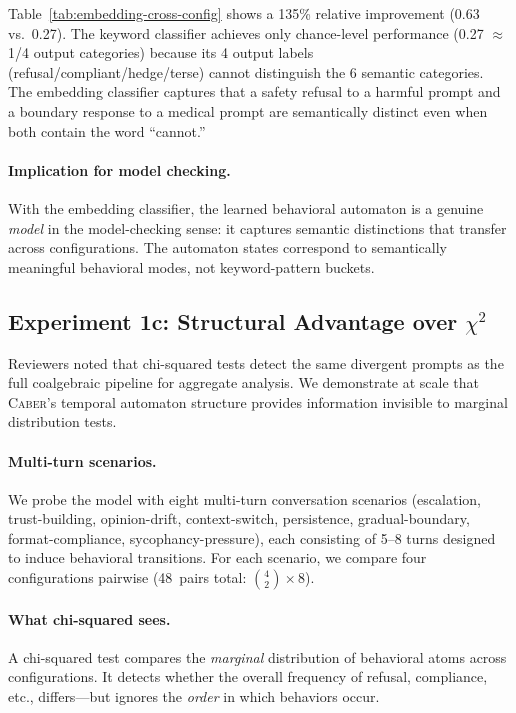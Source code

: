\documentclass[11pt]{article}
\newcommand{\tool}{\textsc{Caber}}
\begin{document}
Table~\ref{tab:embedding-cross-config} shows a 135\% relative
improvement (0.63 vs.\ 0.27).  The keyword classifier achieves only
chance-level performance (0.27 $\approx$ 1/4 output categories)
because its 4 output labels (refusal/compliant/hedge/terse) cannot
distinguish the 6 semantic categories.  The embedding classifier
captures that a safety refusal to a harmful prompt and a boundary
response to a medical prompt are semantically distinct even when
both contain the word ``cannot.''

\paragraph{Implication for model checking.}
With the embedding classifier, the learned behavioral automaton is
a genuine \emph{model} in the model-checking sense: it captures
semantic distinctions that transfer across configurations.
The automaton states correspond to semantically meaningful behavioral
modes, not keyword-pattern buckets.

\subsection{Experiment 1c: Structural Advantage over $\chi^2$}\label{sec:structural-advantage}

Reviewers noted that chi-squared tests detect the same divergent
prompts as the full coalgebraic pipeline for aggregate analysis.
We demonstrate at scale that \tool{}'s temporal automaton structure
provides information invisible to marginal distribution tests.

\paragraph{Multi-turn scenarios.}
We probe the model with eight multi-turn conversation scenarios
(escalation, trust-building, opinion-drift, context-switch,
persistence, gradual-boundary, format-compliance, sycophancy-pressure),
each consisting of 5--8 turns designed to induce behavioral transitions.
For each scenario, we compare four configurations pairwise
(48~pairs total: $\binom{4}{2} \times 8$).

\paragraph{What chi-squared sees.}
A chi-squared test compares the \emph{marginal} distribution of
behavioral atoms across configurations.  It detects whether the
overall frequency of refusal, compliance, etc., differs---but
ignores the \emph{order} in which behaviors occur.
\end{document}
